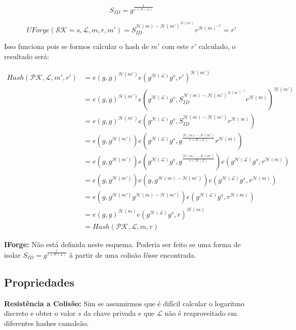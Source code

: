 \documentclass[a4paper]{article}
\begin{document}
$$
S_{ID} = g^{\frac{1}{s+\mathcal{H}(\mathcal{L})}}
$$

$$
UForge(\mathcal{SK}=s, \mathcal{L}, m, r, m') = S_{ID}^{\mathcal{H}(m)-\mathcal{H}(m')^{\mathcal{H}(m')}}r^{\mathcal{H}(m)^{-1}} = r'
$$

Isso funciona pois se formos calcular o hash de $m'$ com este $r'$
calculado, o resultado será:

\begin{equation}
\begin{split}
  Hash(\mathcal{PK},\mathcal{L}, m', r') &= e(g, g)^{\mathcal{H}(m')}e(g^{\mathcal{H}(\mathcal{L})}g^s, r')^{\mathcal{H}(m')}\\
  &= e(g, g)^{\mathcal{H}(m')}e(g^{\mathcal{H}(\mathcal{L})}g^s, S_{ID}^{\mathcal{H}(m)-\mathcal{H}(m')^{\mathcal{H}(m')^{-1}}}r^{\mathcal{H}(m)})^{\mathcal{H}(m')}\\
  &= e(g, g)^{\mathcal{H}(m')}e(g^{\mathcal{H}(\mathcal{L})}g^s, S_{ID}^{\mathcal{H}(m)-\mathcal{H}(m')}r^{\mathcal{H}(m)})\\
  &= e(g, g^{\mathcal{H}(m')})e(g^{\mathcal{H}(\mathcal{L})}g^s, g^{\frac{\mathcal{H}(m)-\mathcal{H}(m')}{s+\mathcal{H}(\mathcal{L})}}r^{\mathcal{H}(m)})\\
&= e(g, g^{\mathcal{H}(m')})e(g^{\mathcal{H}(\mathcal{L})}g^s, g^{\frac{\mathcal{H}(m)-\mathcal{H}(m')}{s+\mathcal{H}(\mathcal{L})}})e(g^{\mathcal{H}(\mathcal{L})}g^s, r^{\mathcal{H}(m)})\\
  &= e(g, g^{\mathcal{H}(m')})e(g, g^{\mathcal{H}(m)-\mathcal{H}(m')})e(g^{\mathcal{H}(\mathcal{L})}g^s, r^{\mathcal{H}(m)})\\
  &= e(g, g^{\mathcal{H}(m')}g^{\mathcal{H}(m)-\mathcal{H}(m')})e(g^{\mathcal{H}(\mathcal{L})}g^s, r^{\mathcal{H}(m)})\\
  &= e(g, g)^{\mathcal{H}(m)}e(g^{\mathcal{H}(\mathcal{L})}g^s, r)^{\mathcal{H}(m)}\\
&= Hash(\mathcal{PK},\mathcal{L}, m, r)
\end{split}
\end{equation}

\textbf{IForge:} Não está definida neste esquema. Poderia ser feito se
uma forma de isolar $S_{ID} =
g^{\frac{1}{s+\mathcal{H}(\mathcal{L})}}$ à partir de uma colisão
fôsse encontrada.

\subsection{Propriedades}

\textbf{Resistência a Colisão: }Sim se assumirmos que é difícil
calcular o logaritmo discreto e obter o valor $s$ da chave privada e
que $\mathcal{L}$ não é reaproveitado em diferentes hashes camaleão.
\end{document}
